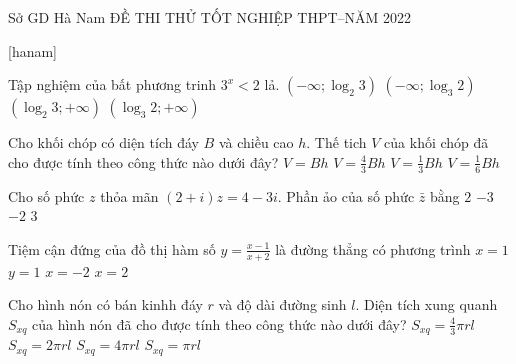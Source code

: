 \begin{name}
{Sở GD Hà Nam}
{ĐỀ THI THỬ TỐT NGHIỆP THPT--NĂM 2022 }
\end{name}
[hanam]
\begin{ex} %
Tập nghiệm của bất phương trinh $3^{x}<2$ lả.
\choice
{$\left(-\infty ; \log _{2} 3\right)$}
{\True $\left(-\infty ; \log _{3} 2\right)$}
{$\left(\log _{2} 3 ;+\infty\right)$}
{$\left(\log _{3} 2 ;+\infty\right)$}
\end{ex}

\begin{ex} %
Cho khối chóp có diện tích đáy $B$ và chiều cao $h$. Thế tich $V$ của khối chóp đã cho được tính theo công thức nào dưới đây?
\choice
{$V=B h$}
{$V=\frac{4}{3} B h$}
{\True $V=\frac{1}{3} B h$}
{$V=\frac{1}{6} B h$}
\end{ex}

\begin{ex} %
Cho số phức $z$ thỏa mãn $(2+i) z=4-3 i$. Phần ảo của số phức $\bar{z}$ bằng 
\choice
{\True $2$}
{$-3$}
{$-2$}
{$3$}
\end{ex}

\begin{ex}%
Tiệm cận đứng của đồ thị hàm số $y=\frac{x-1}{x+2}$ là đường thẳng có phương trình
\choice
{$x=1$}
{$y=1$}
{\True $x=-2$}
{$x=2$}
\end{ex}

\begin{ex}%
Cho hình nón có bán kinhh đáy $r$ và độ dài đường sinh $l$. Diện tích xung quanh $S_{x q}$ của hình nón đã cho được tính theo công thức nào dưới đây?
\choice
{$S_{x q}=\frac{4}{3} \pi r l$}
{$S_{x q}=2 \pi r l$}
{$S_{x q}=4 \pi r l$}
{\True $S_{x q}=\pi r l$}
\end{ex}

\begin{ex}%
{
}
\end{ex}



